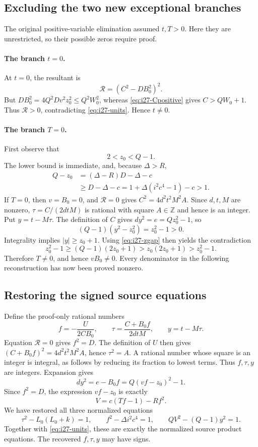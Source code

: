 \subsection{Excluding the two new exceptional branches}

The original positive-variable elimination assumed $t,T>0$. Here they
are unrestricted, so their possible zeros require proof.

\paragraph{The branch $t=0$.}
At $t=0$, the resultant is
\[
 \mathcal R=(C^2-DB_0^2)^2.
\]
But $DB_0^2=4Q^2Dv^2z_0^2\le Q^2W_0^2$, whereas
\eqref{eq:i27-Cpositive} gives $C>QW_0+1$. Thus $\mathcal R>0$,
contradicting \eqref{eq:i27-units}. Hence $t\ne0$.

\paragraph{The branch $T=0$.}
First observe that
\begin{equation}
 2<z_0<Q-1.
 \label{eq:i27-zgap}
\end{equation}
The lower bound is immediate, and, because $\Delta>R$,
\begin{align*}
 Q-z_0
   &=(\Delta-R)D-\Delta-c\\
   &\ge D-\Delta-c
     =1+\Delta(i^2c^4-1)-c>1.
\end{align*}
If $T=0$, then $v=B_0=0$, and $\mathcal R=0$ gives
$C^2=4d^2t^2M^2A$. Since $d,t,M$ are nonzero,
$\tau=C/(2dtM)$ is rational with square $A\in\mathbb Z$ and hence
is an integer. Put $y=t-M\tau$. The definition of $C$ gives
$dy^2=e=Qz_0^2-1$, so
\[
 (Q-1)(y^2-z_0^2)=z_0^2-1>0.
\]
Integrality implies $|y|\ge z_0+1$. Using
\eqref{eq:i27-zgap} then yields the contradiction
\[
 z_0^2-1\ge(Q-1)(2z_0+1)>z_0(2z_0+1)>z_0^2-1.
\]
Therefore $T\ne0$, and hence $vB_0\ne0$. Every denominator in the
following reconstruction has now been proved nonzero.

\subsection{Restoring the signed source equations}

Define the proof-only rational numbers
\[
 f=-\frac{U}{2CB_0},\qquad
 \tau=\frac{C+B_0f}{2dtM},\qquad
 y=t-M\tau.
\]
Equation $\mathcal R=0$ gives $f^2=D$. The definition of $U$ then
gives $(C+B_0f)^2=4d^2t^2M^2A$, hence $\tau^2=A$. A rational number
whose square is an integer is integral, as follows by reducing its
fraction to lowest terms. Thus $f,\tau,y$ are integers. Expansion gives
\[
 dy^2=e-B_0f=Q(vf-z_0)^2-1.
\]
Since $f^2=D$, the expression $vf-z_0$ is exactly
\[
 V=c(Tf-1)-Rf^2.
\]
We have restored all three normalized equations
\begin{equation}
 \tau^2-L_0(L_0+k)=1,
 \qquad f^2-\Delta i^2c^4=1,
 \qquad QV^2-(Q-1)y^2=1.
 \label{eq:i27-restored}
\end{equation}
Together with \eqref{eq:i27-units}, these are exactly the normalized
source product equations. The recovered $f,\tau,y$ may have signs.

